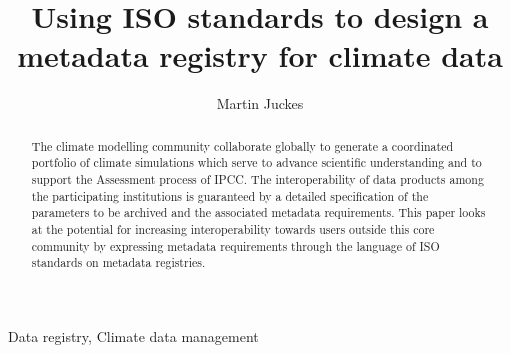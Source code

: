\begin{frontmatter}

\title{Using ISO standards to design a metadata registry for climate data}

\author{Martin Juckes}
\address{Rutherford Appleton Laboratory, Didcot, UK}




\begin{abstract}
The climate modelling community collaborate globally to generate a coordinated portfolio of climate simulations which serve to advance scientific understanding and to support the Assessment process of IPCC. 
The interoperability of data products among the participating institutions is guaranteed by a detailed specification of the parameters to be archived and the associated metadata requirements.
This paper looks at the potential for increasing interoperability towards users outside this core community by expressing metadata requirements through the language of ISO standards on metadata registries. 
\end{abstract}

\begin{keyword}
Data registry\sep
Climate data management
\end{keyword}

\end{frontmatter}

\linenumbers

